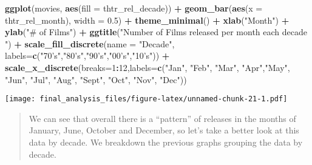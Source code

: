 \documentclass[]{article}
\newenvironment{Shaded}{\begin{snugshade}}{\end{snugshade}}
\newcommand{\DataTypeTok}[1]{\textcolor[rgb]{0.13,0.29,0.53}{#1}}
\newcommand{\DecValTok}[1]{\textcolor[rgb]{0.00,0.00,0.81}{#1}}
\newcommand{\FloatTok}[1]{\textcolor[rgb]{0.00,0.00,0.81}{#1}}
\newcommand{\KeywordTok}[1]{\textcolor[rgb]{0.13,0.29,0.53}{\textbf{#1}}}
\newcommand{\NormalTok}[1]{#1}
\newcommand{\OperatorTok}[1]{\textcolor[rgb]{0.81,0.36,0.00}{\textbf{#1}}}
\newcommand{\StringTok}[1]{\textcolor[rgb]{0.31,0.60,0.02}{#1}}
\begin{document}
\begin{Shaded}
\begin{Highlighting}[]
\KeywordTok{ggplot}\NormalTok{(movies, }\KeywordTok{aes}\NormalTok{(}\DataTypeTok{fill =}\NormalTok{ thtr_rel_decade)) }\OperatorTok{+}\StringTok{ }\KeywordTok{geom_bar}\NormalTok{(}\KeywordTok{aes}\NormalTok{(}\DataTypeTok{x =}\NormalTok{ thtr_rel_month), }\DataTypeTok{width =} \FloatTok{0.5}\NormalTok{) }\OperatorTok{+}\StringTok{ }\KeywordTok{theme_minimal}\NormalTok{() }\OperatorTok{+}\StringTok{ }\KeywordTok{xlab}\NormalTok{(}\StringTok{"Month"}\NormalTok{) }\OperatorTok{+}\StringTok{ }\KeywordTok{ylab}\NormalTok{(}\StringTok{"# of Films"}\NormalTok{) }\OperatorTok{+}\StringTok{ }\KeywordTok{ggtitle}\NormalTok{(}\StringTok{"Number of Films released per month each decade "}\NormalTok{) }\OperatorTok{+}\StringTok{ }\KeywordTok{scale_fill_discrete}\NormalTok{(}\DataTypeTok{name =} \StringTok{"Decade"}\NormalTok{, }\DataTypeTok{labels=}\KeywordTok{c}\NormalTok{(}\StringTok{"70's"}\NormalTok{,}\StringTok{"80's"}\NormalTok{,}\StringTok{"90's"}\NormalTok{,}\StringTok{"00's"}\NormalTok{,}\StringTok{"10's"}\NormalTok{)) }\OperatorTok{+}\StringTok{ }\KeywordTok{scale_x_discrete}\NormalTok{(}\DataTypeTok{breaks=}\DecValTok{1}\OperatorTok{:}\DecValTok{12}\NormalTok{,}\DataTypeTok{labels=}\KeywordTok{c}\NormalTok{(}\StringTok{"Jan"}\NormalTok{, }\StringTok{"Feb"}\NormalTok{, }\StringTok{"Mar"}\NormalTok{, }\StringTok{"Apr"}\NormalTok{,}\StringTok{"May"}\NormalTok{, }\StringTok{"Jun"}\NormalTok{, }\StringTok{"Jul"}\NormalTok{, }\StringTok{"Aug"}\NormalTok{, }\StringTok{"Sept"}\NormalTok{, }\StringTok{"Oct"}\NormalTok{, }\StringTok{"Nov"}\NormalTok{, }\StringTok{"Dec"}\NormalTok{))}
\end{Highlighting}
\end{Shaded}

\texttt{[image: final\_analysis\_files/figure-latex/unnamed-chunk-21-1.pdf]}

\begin{quote}
We can see that overall there is a ``pattern'' of releases in the months
of January, June, October and December, so let's take a better look at
this data by decade. We breakdown the previous graphs grouping the data
by decade.
\end{quote}
\end{document}
